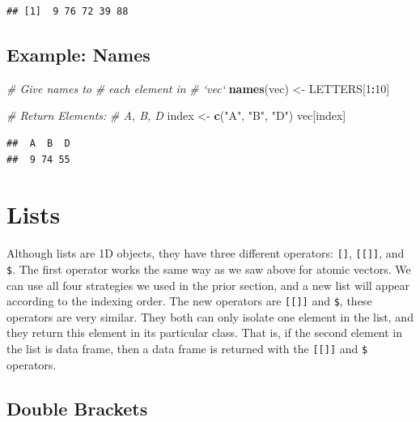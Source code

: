 \documentclass[
]{book}
\newenvironment{Shaded}{\begin{snugshade}}{\end{snugshade}}
\newcommand{\CommentTok}[1]{\textcolor[rgb]{0.56,0.35,0.01}{\textit{#1}}}
\newcommand{\DecValTok}[1]{\textcolor[rgb]{0.00,0.00,0.81}{#1}}
\newcommand{\KeywordTok}[1]{\textcolor[rgb]{0.13,0.29,0.53}{\textbf{#1}}}
\newcommand{\NormalTok}[1]{#1}
\newcommand{\OperatorTok}[1]{\textcolor[rgb]{0.81,0.36,0.00}{\textbf{#1}}}
\newcommand{\StringTok}[1]{\textcolor[rgb]{0.31,0.60,0.02}{#1}}
\begin{document}
\begin{verbatim}
## [1]  9 76 72 39 88
\end{verbatim}

\hypertarget{example-names}{%
\subsection*{Example: Names}\label{example-names}}

\begin{Shaded}
\begin{Highlighting}[]
\CommentTok{# Give names to}
\CommentTok{# each element in}
\CommentTok{# `vec`}
\KeywordTok{names}\NormalTok{(vec) <-}\StringTok{ }\NormalTok{LETTERS[}\DecValTok{1}\OperatorTok{:}\DecValTok{10}\NormalTok{]}

\CommentTok{# Return Elements:}
\CommentTok{# A, B, D}
\NormalTok{index <-}\StringTok{ }\KeywordTok{c}\NormalTok{(}\StringTok{"A"}\NormalTok{, }\StringTok{"B"}\NormalTok{,}
    \StringTok{"D"}\NormalTok{)}
\NormalTok{vec[index]}
\end{Highlighting}
\end{Shaded}

\begin{verbatim}
##  A  B  D 
##  9 74 55
\end{verbatim}

\hypertarget{lists-1}{%
\section{Lists}\label{lists-1}}

Although lists are 1D objects, they have three different operators: \texttt{{[}{]}}, \texttt{{[}{[}{]}{]}}, and \texttt{\$}. The first operator works the same way as we saw above for atomic vectors. We can use all four strategies we used in the prior section, and a new list will appear according to the indexing order. The new operators are \texttt{{[}{[}{]}{]}} and \texttt{\$}, these operators are very similar. They both can only isolate one element in the list, and they return this element in its particular class. That is, if the second element in the list is data frame, then a data frame is returned with the \texttt{{[}{[}{]}{]}} and \texttt{\$} operators.

\hypertarget{double-brackets}{%
\subsection{Double Brackets}\label{double-brackets}}
\end{document}
